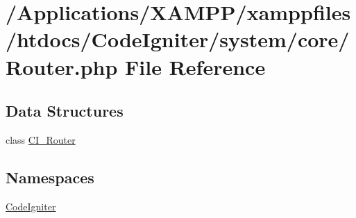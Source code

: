 \hypertarget{_router_8php}{}\section{/\+Applications/\+X\+A\+M\+P\+P/xamppfiles/htdocs/\+Code\+Igniter/system/core/\+Router.php File Reference}
\label{_router_8php}
\subsection*{Data Structures}
\begin{DoxyCompactItemize}
\item 
class \mbox{\hyperlink{class_c_i___router}{C\+I\+\_\+\+Router}}
\end{DoxyCompactItemize}
\subsection*{Namespaces}
\begin{DoxyCompactItemize}
\item 
 \mbox{\hyperlink{namespace_code_igniter}{Code\+Igniter}}
\end{DoxyCompactItemize}
